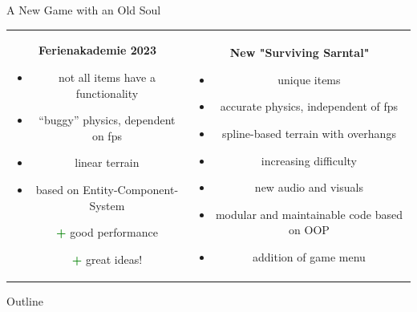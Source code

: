 \begin{frame}{A New Game with an Old Soul}
    \centering
    \begin{tabular}{cc}
        \begin{tcolorbox}[colback=boxcolor, width=0.5\textwidth, height=6.5cm, colframe=boxcolor, rounded corners]
            \textbf{Ferienakademie 2023}
            \begin{itemize}
                \setbeamertemplate{itemize item}{\textcolor{red}{\textbf{-}}}
                \item not all items have a functionality
                \item ``buggy'' physics, dependent on fps
                \item linear terrain
                \item based on Entity-Component-System
                \item[\textcolor{green}{\textbf{+}}] good performance
                \item[\textcolor{green}{\textbf{+}}] great ideas!
            \end{itemize}
        \end{tcolorbox}
        &
        \begin{tcolorbox}[colback=boxcolor, width=0.5\textwidth, height=6.5cm, colframe=boxcolor, rounded corners]
            \textbf{New "Surviving Sarntal"}
            \begin{itemize}
                \setbeamertemplate{itemize item}{\textcolor{green}{\textbf{+}}}
                \item unique items
                \item accurate physics, independent of fps
                \item spline-based terrain with overhangs
                \item increasing difficulty
                \item new audio and visuals 
                \item modular and maintainable code based on OOP
                \item addition of game menu
            \end{itemize}
        \end{tcolorbox}
    \end{tabular}
\end{frame}


\begin{frame}{Outline}
    \tableofcontents
\end{frame}


